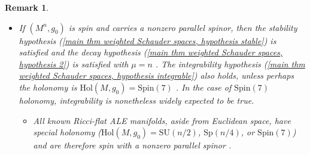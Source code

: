 \documentclass[12pt]{amsart}
\renewcommand{\1}{{\mathbf 1}}
\theoremstyle{others}
\newtheorem{rmk}[thm]{Remark}
\numberwithin{equation}{section}
\begin{document}
\begin{rmk}
\begin{itemize}
        



        \vspace{2mm}

        \item If $(M^n, g_0)$ is spin and carries a nonzero parallel spinor, then the stability hypothesis (\ref{main thm weighted Schauder spaces, hypothesis stable}) is satisfied \cite{DaiWangWei05} and the decay hypothesis (\ref{main thm weighted Schauder spaces, hypothesis 2}) is satisfied with $\mu = n$ \cite{KronckePetersen22}.  %
        The integrability hypothesis (\ref{main thm weighted Schauder spaces, hypothesis integrable}) also holds, unless perhaps the holonomy is $\text{Hol}(M, g_0) = \text{Spin}(7)$ \cite[Theorem 2.18]{DeruelleKroncke20}.
        In the case of $\text{Spin}(7)$ holonomy, integrability is nonetheless widely expected to be true.

        \begin{itemize}
            \item All known Ricci-flat ALE manifolds, aside from Euclidean space, have special holonomy 
            ($\text{Hol}(M, g_0) = \text{SU}(n/2)$, $\text{Sp}(n/4)$, or $\text{Spin}(7)$) and are therefore spin with a nonzero parallel spinor \cite[Remark 1.4]{KronckePetersen20}.
        \end{itemize}


\end{itemize}
\end{rmk}
\end{document}
